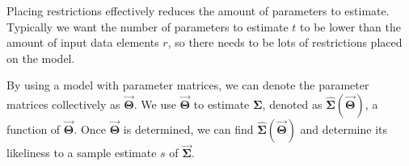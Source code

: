 \documentclass{article}
\begin{document}
\begin{multicols*}{2}
Placing restrictions effectively reduces the amount of parameters to estimate. Typically we want the number of parameters to estimate $t$ to be lower than the amount of input data elements $r$, so there needs to be lots of restrictions placed on the model.

By using a model with parameter matrices, we can denote the parameter matrices collectively as $\mathbf{\vec{\Theta}}$. We use $\mathbf{\vec{\Theta}}$ to estimate $\mathbf{\Sigma}$, denoted as $\mathbf{\hat{\Sigma}}(\mathbf{\vec{\Theta}})$, a function of $\mathbf{\vec{\Theta}}$. Once $\mathbf{\vec{\Theta}}$ is determined, we can find $\mathbf{\hat{\Sigma}}(\mathbf{\vec{\Theta}})$ and determine its likeliness to a sample estimate $s$ of $\mathbf{\vec{\Sigma}}$.

\end{multicols*}
\end{document}
